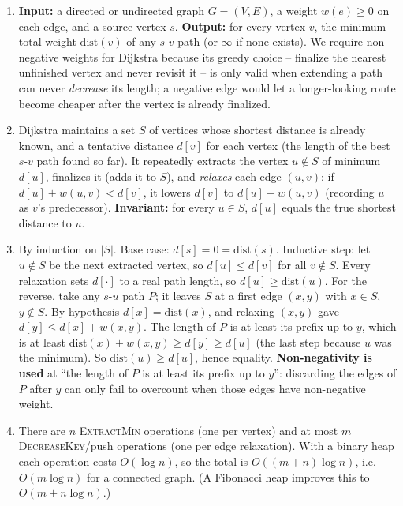 \documentclass[11pt]{article}
\begin{document}
\begin{enumerate}[label=\textbf{A\arabic*.}, leftmargin=2.2em]

\item \textbf{Input:} a directed or undirected graph $G=(V,E)$, a weight $w(e)\ge
0$ on each edge, and a source vertex $s$. \textbf{Output:} for every vertex $v$,
the minimum total weight $\mathrm{dist}(v)$ of any $s$-$v$ path (or $\infty$ if
none exists). We require non-negative weights for Dijkstra because its greedy
choice -- finalize the nearest unfinished vertex and never revisit it -- is only
valid when extending a path can never \emph{decrease} its length; a negative edge
would let a longer-looking route become cheaper after the vertex is already
finalized.

\item Dijkstra maintains a set $S$ of vertices whose shortest distance is already
known, and a tentative distance $d[v]$ for each vertex (the length of the best
$s$-$v$ path found so far). It repeatedly extracts the vertex $u \notin S$ of
minimum $d[u]$, finalizes it (adds it to $S$), and \emph{relaxes} each edge
$(u,v)$: if $d[u]+w(u,v) < d[v]$, it lowers $d[v]$ to $d[u]+w(u,v)$ (recording
$u$ as $v$'s predecessor). \textbf{Invariant:} for every $u \in S$, $d[u]$ equals
the true shortest distance to $u$.

\item By induction on $|S|$. Base case: $d[s]=0=\mathrm{dist}(s)$. Inductive
step: let $u\notin S$ be the next extracted vertex, so $d[u]\le d[v]$ for all
$v\notin S$. Every relaxation sets $d[\cdot]$ to a real path length, so
$d[u]\ge\mathrm{dist}(u)$. For the reverse, take any $s$-$u$ path $P$; it leaves
$S$ at a first edge $(x,y)$ with $x\in S$, $y\notin S$. By hypothesis
$d[x]=\mathrm{dist}(x)$, and relaxing $(x,y)$ gave $d[y]\le d[x]+w(x,y)$. The
length of $P$ is at least its prefix up to $y$, which is at least
$\mathrm{dist}(x)+w(x,y)\ge d[y]\ge d[u]$ (the last step because $u$ was the
minimum). So $\mathrm{dist}(u)\ge d[u]$, hence equality. \textbf{Non-negativity
is used} at ``the length of $P$ is at least its prefix up to $y$'': discarding
the edges of $P$ after $y$ can only fail to overcount when those edges have
non-negative weight.

\item There are $n$ \textsc{ExtractMin} operations (one per vertex) and at most
$m$ \textsc{DecreaseKey}/push operations (one per edge relaxation). With a binary
heap each operation costs $O(\log n)$, so the total is $O((m+n)\log n)$, i.e.\
$O(m\log n)$ for a connected graph. (A Fibonacci heap improves this to
$O(m+n\log n)$.)


\end{enumerate}
\end{document}
